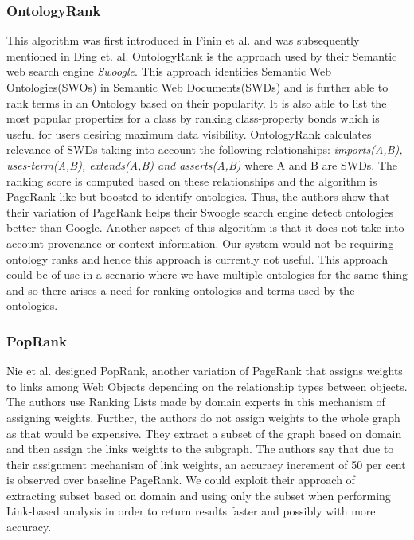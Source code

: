 \documentclass{article}
\begin{document}
    \subsubsection{OntologyRank}
    This algorithm was first introduced in Finin et al.\cite{finin04} and was subsequently mentioned in Ding et. al.\cite{ding05} OntologyRank is the approach used by their Semantic web search engine \emph{Swoogle}. This approach identifies Semantic Web Ontologies(SWOs) in Semantic Web Documents(SWDs) and is further able to rank terms in an Ontology based on their popularity. It is also able to list the most popular properties for a class by ranking class-property bonds which is useful for users desiring maximum data visibility. OntologyRank calculates relevance of SWDs taking into account the following relationships: \emph{imports(A,B), uses-term(A,B),  extends(A,B) and asserts(A,B)} where A and B are SWDs. The ranking score is computed based on these relationships and the algorithm is PageRank like but boosted to identify ontologies. Thus, the authors show that their variation of PageRank helps their Swoogle search engine detect ontologies better than Google.  Another aspect of this algorithm is that it does not take into account provenance or context information. Our system would not be requiring ontology ranks and hence this approach is currently not useful. This approach could be of use in a scenario where we have multiple ontologies for the same thing and so there arises a need for ranking ontologies and terms used by the ontologies.

    \subsubsection{PopRank}
    Nie et al.\cite{nie05} designed PopRank, another variation of PageRank that assigns weights to links among Web Objects depending on the relationship types between objects. The authors use Ranking Lists made by domain experts in this mechanism of assigning weights. Further, the authors do not assign weights to the whole graph as that would be expensive. They extract a subset of the graph based on domain and then assign the links weights to the subgraph. The authors say that due to their assignment mechanism of link weights, an accuracy increment of 50 per cent is observed over baseline PageRank. We could exploit their approach of extracting subset based on domain and using only the subset when performing Link-based analysis in order to return results faster and possibly with more accuracy.
\end{document}

